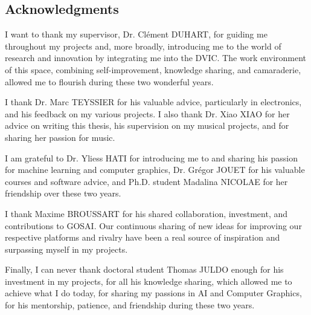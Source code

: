\subsection*{Acknowledgments}

I want to thank my supervisor, Dr. Clément DUHART, for guiding me throughout my projects and, more broadly, introducing me to the world of research and innovation by integrating me into the DVIC. The work environment of this space, combining self-improvement, knowledge sharing, and camaraderie, allowed me to flourish during these two wonderful years.

I thank Dr. Marc TEYSSIER for his valuable advice, particularly in electronics, and his feedback on my various projects. I also thank Dr. Xiao XIAO for her advice on writing this thesis, his supervision on my musical projects, and for sharing her passion for music.

I am grateful to Dr. Yliess HATI for introducing me to and sharing his passion for machine learning and computer graphics, Dr. Grégor JOUET for his valuable courses and software advice, and Ph.D. student Madalina NICOLAE for her friendship over these two years.

I thank Maxime BROUSSART for his shared collaboration, investment, and contributions to GOSAI. Our continuous sharing of new ideas for improving our respective platforms and rivalry have been a real source of inspiration and surpassing myself in my projects.

Finally, I can never thank doctoral student Thomas JULDO enough for his investment in my projects, for all his knowledge sharing, which allowed me to achieve what I do today, for sharing my passions in AI and Computer Graphics, for his mentorship, patience, and friendship during these two years. 